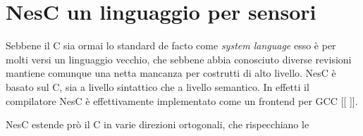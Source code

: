 \documentclass[pdftex,11pt,a4paper,italian]{book}
\begin{document}
\section{NesC un linguaggio per sensori}

Sebbene il C sia ormai lo standard de facto come \emph{system language} esso è per molti versi 
un linguaggio vecchio, che sebbene abbia conosciuto diverse revisioni mantiene comunque una 
netta mancanza per costrutti di alto livello. 
NesC è basato sul C, sia a livello sintattico che a livello semantico. 
In effetti il compilatore NesC è effettivamente implementato come un frontend per GCC [[ ]].

NesC estende prò il C in varie direzioni ortogonali, che rispecchiano le 
\end{document}
